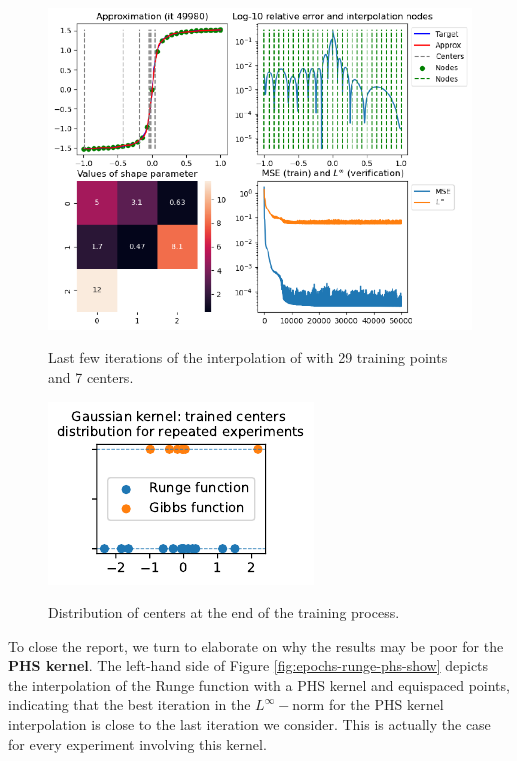 \documentclass[12pt]{report} %
\newcommand{\tmverbatim}[1]{\text{{\ttfamily{#1}}}}
\begin{document}
\begin{figure}[ht]
  {\includegraphics[width=.9\textwidth]{imagenes/experiments/1d/re_testing/reproducibility_gibbs.pdf}}
  \caption{Last few iterations of the interpolation of
  \tmverbatim{gibbs\_function} with 29 training points and 7
  centers.\label{last-few-iterations-gibbs}}
\end{figure}

\begin{figure}
\caption{Distribution of centers at the end of the training
  process.\label{fig-centers-end}}
{\includegraphics[width=\textwidth]{imagenes/experiments/1d/re_testing/reproducibility_centers.pdf}}
\end{figure} 

\newpage

To close the report, we turn to elaborate on why the results may be poor for the \textbf{PHS kernel}.
The left-hand side of Figure \ref{fig:epochs-runge-phs-show} depicts the interpolation of the Runge function with a PHS kernel and equispaced points, indicating that the best iteration in the $L^\infty-$norm for the PHS kernel interpolation is close to the last iteration we consider. This is actually the case for every experiment involving this kernel.
\end{document}
